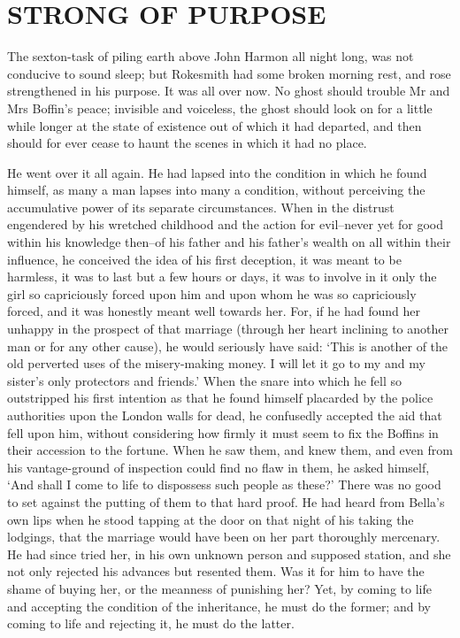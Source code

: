 
\chapter{STRONG OF PURPOSE}

The sexton-task of piling earth above John Harmon all night long, was
not conducive to sound sleep; but Rokesmith had some broken morning
rest, and rose strengthened in his purpose. It was all over now. No
ghost should trouble Mr and Mrs Boffin’s peace; invisible and voiceless,
the ghost should look on for a little while longer at the state of
existence out of which it had departed, and then should for ever cease
to haunt the scenes in which it had no place.

He went over it all again. He had lapsed into the condition in which
he found himself, as many a man lapses into many a condition, without
perceiving the accumulative power of its separate circumstances. When
in the distrust engendered by his wretched childhood and the action for
evil--never yet for good within his knowledge then--of his father and
his father’s wealth on all within their influence, he conceived the idea
of his first deception, it was meant to be harmless, it was to last
but a few hours or days, it was to involve in it only the girl so
capriciously forced upon him and upon whom he was so capriciously
forced, and it was honestly meant well towards her. For, if he had
found her unhappy in the prospect of that marriage (through her heart
inclining to another man or for any other cause), he would seriously
have said: ‘This is another of the old perverted uses of the
misery-making money. I will let it go to my and my sister’s only
protectors and friends.’ When the snare into which he fell so
outstripped his first intention as that he found himself placarded by
the police authorities upon the London walls for dead, he confusedly
accepted the aid that fell upon him, without considering how firmly it
must seem to fix the Boffins in their accession to the fortune. When he
saw them, and knew them, and even from his vantage-ground of inspection
could find no flaw in them, he asked himself, ‘And shall I come to life
to dispossess such people as these?’ There was no good to set against
the putting of them to that hard proof. He had heard from Bella’s own
lips when he stood tapping at the door on that night of his taking
the lodgings, that the marriage would have been on her part thoroughly
mercenary. He had since tried her, in his own unknown person and
supposed station, and she not only rejected his advances but resented
them. Was it for him to have the shame of buying her, or the meanness of
punishing her? Yet, by coming to life and accepting the condition of the
inheritance, he must do the former; and by coming to life and rejecting
it, he must do the latter.

